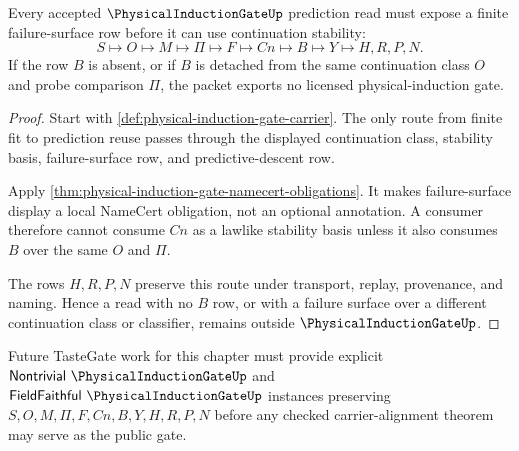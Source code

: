 \begin{theorem}
\label{thm:physical-induction-gate-failure-surface}
Every accepted $\PhysicalInductionGateUp$ prediction read must expose a finite failure-surface row before it can use continuation stability:
$$
S\longmapsto O\longmapsto M\longmapsto \Pi\longmapsto F\longmapsto Cn\longmapsto B\longmapsto Y\longmapsto H,R,P,N .
$$
If the row $B$ is absent, or if $B$ is detached from the same continuation class $O$ and probe comparison $\Pi$, the packet exports no licensed physical-induction gate.
\end{theorem}
\begin{proof}
Start with \autoref{def:physical-induction-gate-carrier}. The only route from finite fit to prediction reuse passes through the displayed continuation class, stability basis, failure-surface row, and predictive-descent row.

Apply \autoref{thm:physical-induction-gate-namecert-obligations}. It makes failure-surface display a local NameCert obligation, not an optional annotation. A consumer therefore cannot consume $Cn$ as a lawlike stability basis unless it also consumes $B$ over the same $O$ and $\Pi$.

The rows $H,R,P,N$ preserve this route under transport, replay, provenance, and naming. Hence a read with no $B$ row, or with a failure surface over a different continuation class or classifier, remains outside $\PhysicalInductionGateUp$.
\end{proof}



Future TasteGate work for this chapter must provide explicit $\mathsf{Nontrivial}\ \PhysicalInductionGateUp$ and $\mathsf{FieldFaithful}\ \PhysicalInductionGateUp$ instances preserving $S,O,M,\Pi,F,Cn,B,Y,H,R,P,N$ before any checked carrier-alignment theorem may serve as the public gate.

